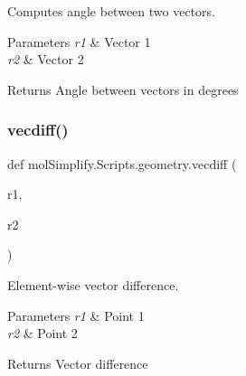Computes angle between two vectors. 


\begin{DoxyParams}{Parameters}
{\em r1} & Vector 1 \\
\hline
{\em r2} & Vector 2 \\
\hline
\end{DoxyParams}
\begin{DoxyReturn}{Returns}
Angle between vectors in degrees 
\end{DoxyReturn}
\mbox{\label{namespacemolSimplify_1_1Scripts_1_1geometry_af1b60f550f00adbeeb61fcff1482d793}} 
\subsubsection{\texorpdfstring{vecdiff()}{vecdiff()}}
{\footnotesize\ttfamily def mol\+Simplify.\+Scripts.\+geometry.\+vecdiff (\begin{DoxyParamCaption}\item[{}]{r1,  }\item[{}]{r2 }\end{DoxyParamCaption})}



Element-\/wise vector difference. 


\begin{DoxyParams}{Parameters}
{\em r1} & Point 1 \\
\hline
{\em r2} & Point 2 \\
\hline
\end{DoxyParams}
\begin{DoxyReturn}{Returns}
Vector difference 
\end{DoxyReturn}
